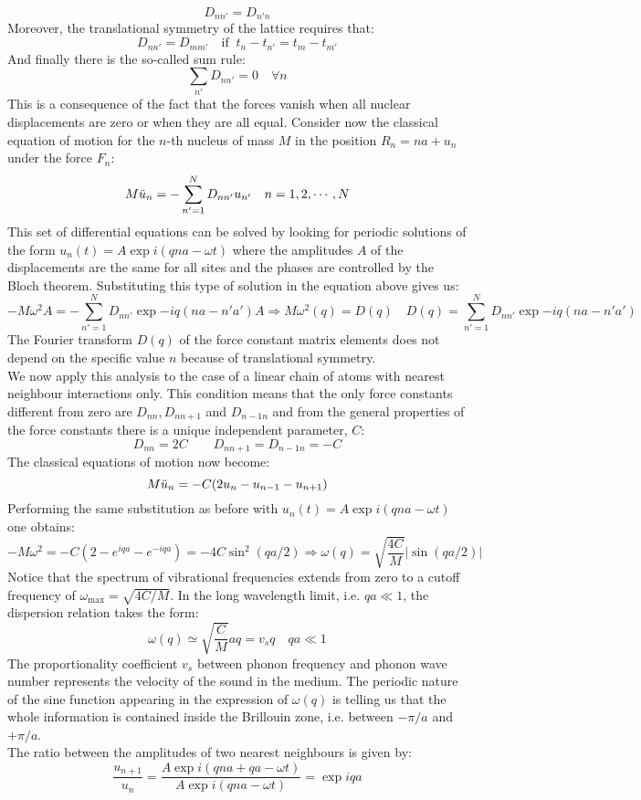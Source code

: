 \documentclass[10.75pt,a4paper,openright,bottom=2cm]{article}
\begin{document}
\[
D_{nn'}=D_{n'n}
\]
Moreover, the translational symmetry of the lattice requires that:
\[
D_{nn'}=D_{mm'} \quad \text{if}\;\; t_n-t_{n'}=t_m-t_{m'}
\]
And finally there is the so-called sum rule:
\[
\sum_{n'}D_{nn'}=0 \quad \forall n
\]
This is a consequence of the fact that the forces vanish when all nuclear displacements are zero or when they are all equal. Consider now the classical equation of motion for the $n$-th nucleus of mass $M$ in the position $R_n=na+u_n$ under the force $F_n$:
\[
M\Ddot{u}_n=-\sum_{n'=1}^ND_{nn'}u_{n'} \quad n=1,2,\cdots,N
\]
This set of differential equations can be solved by looking for periodic solutions of the form $u_n(t)=A\exp{i(qna-\omega t)}$ where the amplitudes $A$ of the displacements are the same for all sites and the phases are controlled by the Bloch theorem. Substituting this type of solution in the equation above gives us:
\[
-M\omega^2A=-\sum_{n'=1}^ND_{nn'}\exp{-iq(na-n'a')}A\Rightarrow M\omega^2(q)=D(q) \quad D(q)=\sum_{n'=1}^ND_{nn'}\exp{-iq(na-n'a')}
\]
The Fourier transform $D(q)$ of the force constant matrix elements does not depend on the specific value $n$ because of translational symmetry.\\
We now apply this analysis to the case of a linear chain of atoms with nearest neighbour interactions only. This condition means that the only force constants different from zero are $D_{nn}, D_{nn+1}$ and $D_{n-1n}$ and from the general properties of the force constants there is a unique independent parameter, $C$:
\[
D_{nn}=2C \qquad D_{nn+1}=D_{n-1n}=-C
\]
The classical equations of motion now become:
\[
M\Ddot{u}_n=-C(2u_n-u_{n-1}-u_{n+1})
\]
Performing the same substitution as before with $u_n(t)=A\exp{i(qna-\omega t)}$ one obtains:
\[
-M\omega^2=-C(2-e^{iqa}-e^{-iqa})=-4C\sin^2(qa/2)\Rightarrow\omega(q)=\sqrt{\frac{4C}{M}}|\sin(qa/2)|
\]
Notice that the spectrum of vibrational frequencies extends from zero to a cutoff frequency of $\omega_{\max}=\sqrt{4C/M}$. In the long wavelength limit, i.e. $qa\ll1$, the dispersion relation takes the form:
\[
\omega(q)\simeq\sqrt{\frac{C}{M}}aq=v_sq \quad qa\ll1
\]
The proportionality coefficient $v_s$ between phonon frequency and phonon wave number represents the velocity of the sound in the medium. The periodic nature of the sine function appearing in the expression of $\omega(q)$ is telling us that the whole information is contained inside the  Brillouin zone, i.e. between $-\pi/a$ and $+\pi/a$.\\
The ratio between the amplitudes of two nearest neighbours is given by:
\[
\frac{u_{n+1}}{u_n}=\frac{A\exp{i(qna+qa-\omega t)}}{A\exp{i(qna-\omega t)}}=\exp{iqa}
\]
\end{document}
